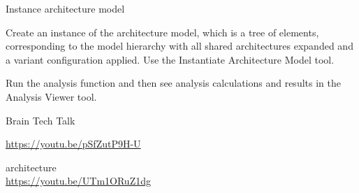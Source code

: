 \begin{frame}
\begin{block}{Instance architecture model }

Create an instance of the architecture model, which is a tree of elements, corresponding to the model hierarchy with all shared architectures expanded and a variant configuration applied. Use the Instantiate Architecture Model tool.

Run the analysis function and then see analysis calculations and results in the Analysis Viewer tool.

\end{block}
\end{frame}



\begin{frame}
\begin{block}{Brain Tech Talk }

\url{https://youtu.be/pSfZutP9H-U}

architecture \\
\url{https://youtu.be/UTm1ORuZ1dg}

\end{block}
\end{frame}


